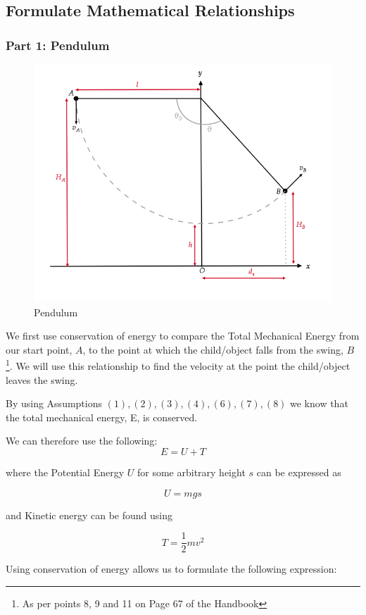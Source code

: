 \documentclass{article}
\begin{document}
\subsection*{Formulate Mathematical Relationships}

\subsubsection*{Part 1: Pendulum}

\begin{figure}[H]
    \centering
    \includegraphics[width=0.70\linewidth]{Fig 2.png}
    \caption{Pendulum}
    \label{fig: Pendulum diagram}
\end{figure}

We first use conservation of energy to compare the Total Mechanical Energy from our start point, $A$, to the point at which the child/object falls from the swing, $B$\footnote{As per points 8, 9 and 11 on Page 67 of the Handbook}. We will use this relationship to find the velocity at the point the child/object leaves the swing.
\par
\noindent By using Assumptions $(1), (2), (3), (4), (6), (7), (8)$ we know that the total mechanical energy, E, is conserved.
\par
\noindent We can therefore use the following: 
\begin{equation}
    E = U + T
\end{equation}

where the Potential Energy $U$ for some arbitrary height $s$ can be expressed as

\[ U = mgs \]

and Kinetic energy can be found using

\[ T = \frac{1}{2} mv^2 \]

\par
\noindent Using conservation of energy allows us to formulate the following expression:
\end{document}
